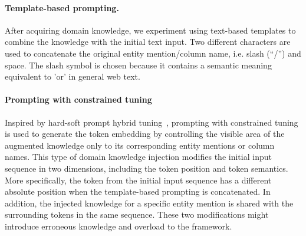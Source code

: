 \paragraph{Template-based prompting.}
After acquiring domain knowledge, we experiment using text-based templates to combine the knowledge with the initial text input. 
Two different characters are used to concatenate the original entity mention/column name, i.e. slash (``/'') and space. 
The slash symbol is chosen because it contains a semantic meaning equivalent to 'or' in general web text.


\paragraph{Prompting with constrained tuning}
Inspired by hard-soft prompt hybrid tuning~\cite{han_2021},  prompting with constrained tuning is used to generate the token embedding by controlling the visible area of the augmented knowledge only to its corresponding entity mentions or column names. This type of domain knowledge injection modifies the initial input sequence in two dimensions, including the token position and token semantics. More specifically, the token from the initial input sequence has a different absolute position when the template-based prompting is concatenated. In addition, the injected knowledge for a specific entity mention is shared with the surrounding tokens in the same sequence. These two modifications might introduce erroneous knowledge and overload to the framework.

